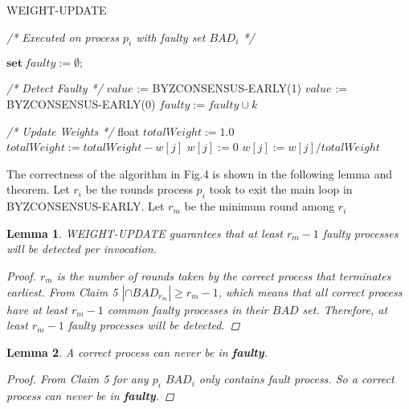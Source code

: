 \documentclass[conference]{IEEEtran}
\newtheorem{l1}{Lemma}
\begin{document}
\begin{algorithm}
\caption{WEIGHT-UPDATE}\label{euclid}
\textit{/* Executed on process $p_{i}$ with faulty set $BAD_{i} $ */}

\begin{algorithmic}[1]
\STATE $\textbf{set} ~\textit{faulty} := \emptyset;$
\item[]
\item[]
\textit{/* Detect Faulty */}
\STATE $value$ := BYZCONSENSUS-EARLY(1)
\ELSE
\STATE $value$ := BYZCONSENSUS-EARLY(0)
\ENDIF
{} 
\STATE $faulty := faulty \cup {k}$
\ENDIF
\ENDFOR
\item[]
\item[]
\textit{/* Update Weights */}
\STATE float $totalWeight := 1.0$
\STATE $totalWeight := totalWeight - w[j]$
\STATE $w[j] := 0$
\ENDFOR
{}
\STATE $w[j] := w[j]/totalWeight$
\ENDFOR
\end{algorithmic}
\end{algorithm}


The correctness of the algorithm in Fig.4 is shown in the following lemma and theorem. Let $r_i$ be the rounds process $p_i$ took to exit the main loop in BYZCONSENSUS-EARLY. Let $r_m$ be the minimum round among $r_i$  

\begin{l1}
WEIGHT-UPDATE guarantees that at least $r_m - 1$ faulty processes will be detected per invocation.
\begin{proof}
$r_m$ is the number of rounds taken by the correct process that terminates earliest. From Claim 5  $|\cap BAD_{r_m}| \geq r_m - 1$, which means that all correct process have at least $r_m - 1$ common faulty processes in their $BAD$ set. Therefore, at least $r_m - 1$ faulty processes will be detected.
\end{proof}
\end{l1}


\begin{l1}
A correct process can never be in \textbf{faulty}. 
\begin{proof}
From Claim 5 for any $p_i$ $BAD_i$ only contains fault process. So a correct process can never be in \textit{\textbf{faulty}}.
\end{proof}
\end{l1}
\end{document}
